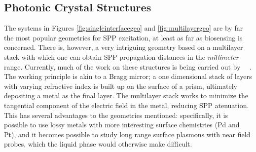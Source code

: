 \subsection{Photonic Crystal Structures}
The systems in Figures \ref{fig:singleinterfacegeo} and
\ref{fig:multilayergeo} are by far the most popular geometries for SPP
excitation, at least as far as biosensing is concerned.  There
is, however, a very intriguing geometry based on a multilayer stack with
which one can obtain SPP propagation distances in the \textit{millimeter}
range.  Currently, much of the work on these structures is being carried
out by ~\cite{konopsky2006long}~\cite{konopsky2009long}.
The working principle is akin to a Bragg mirror; a one dimensional stack of
layers with varying refractive index is built up on the surface of a prism,
ultimately depositing a metal as the final layer.  The multilayer stack
works to minimize the tangential component of the electric field in the
metal, reducing SPP atenuation.  This has several advantages to the
geometries mentioned: specifically, it is possible to use lossy metals with
more interesting surface chemistries (Pd and Pt), and it becomes possible
to study long range surface plasmons with near field probes, which the
liquid phase would otherwise make difficult.
